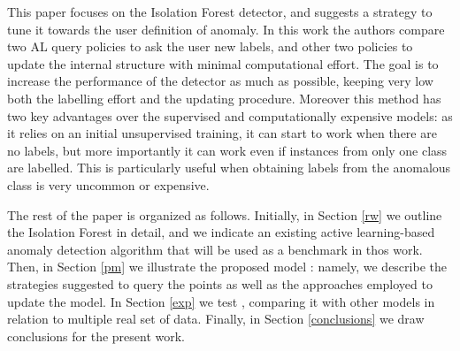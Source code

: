 
This paper focuses on the Isolation Forest detector, and suggests a strategy to tune it towards the user definition of anomaly. In this work the authors compare two AL query policies to ask the user new labels, and other two policies to update the internal structure with minimal computational effort. The goal is to increase the performance of the detector as much as possible, keeping very low both the labelling effort and the updating procedure. Moreover this method has two key advantages over the supervised and computationally expensive models: as it relies on an initial unsupervised training, it can start to work when there are no labels, but more importantly it can work even if instances from only one class are labelled. This is particularly useful when obtaining labels from the anomalous class is very uncommon or expensive.

The rest of the paper is organized as follows. Initially, in Section \ref{rw} we outline the Isolation Forest in detail, and we indicate an existing active learning-based anomaly detection algorithm that will be used as a benchmark in thos work. Then, in Section \ref{pm} we illustrate the proposed model \approach: namely, we describe the strategies suggested to query the points as well as the approaches employed to update the model. In Section \ref{exp} we test \approach, comparing it with other models in relation to multiple real set of data. Finally, in Section \ref{conclusions} we draw conclusions for the present work.

